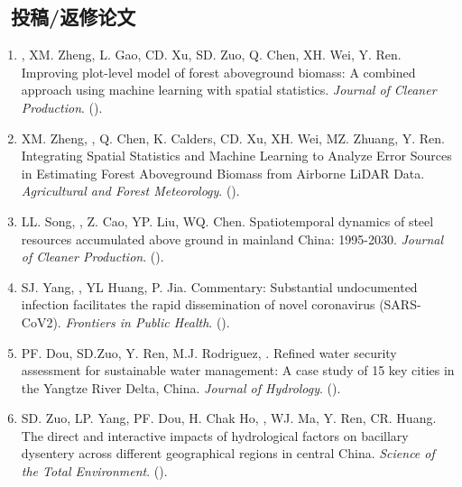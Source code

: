 \subsection*{\texorpdfstring{\faBook\ 投稿/返修论文}{投稿/返修论文}}
\begin{enumerate}
\item
    \Shaoqing\CF, XM. Zheng, L. Gao, CD. Xu, SD. Zuo, Q. Chen, XH. Wei, Y. Ren.
    Improving plot-level model of forest aboveground biomass: A combined approach using machine learning with spatial statistics.
    \textit{Journal of Cleaner Production}. 
    (\Review).
\item
    XM. Zheng, \Shaoqing, Q. Chen, K. Calders, CD. Xu, XH. Wei, MZ. Zhuang, Y. Ren.
    Integrating Spatial Statistics and Machine Learning to Analyze Error Sources in Estimating Forest Aboveground Biomass from Airborne LiDAR Data.
    \textit{Agricultural and Forest Meteorology}. 
    (\Revision).
\item
    LL. Song, \Shaoqing, Z. Cao, YP. Liu, WQ. Chen.
    Spatiotemporal dynamics of steel resources accumulated above ground in mainland China: 1995-2030.
    \textit{Journal of Cleaner Production}. 
    (\Review).
\item
    SJ. Yang, \Shaoqing, YL Huang, P. Jia.
    Commentary: Substantial undocumented infection facilitates the rapid dissemination of novel coronavirus (SARS-CoV2).
    \textit{Frontiers in Public Health}. 
    (\Review).
\item
    PF. Dou, SD.Zuo, Y. Ren, M.J. Rodriguez, \Shaoqing.
    Refined water security assessment for sustainable water management: A case study of 15 key cities in the Yangtze River Delta, China.
    \textit{Journal of Hydrology}.
    (\Revision).
\item
    SD. Zuo, LP. Yang, PF. Dou, H. Chak Ho, \Shaoqing, WJ. Ma, Y. Ren, CR. Huang.
    The direct and interactive impacts of hydrological factors on bacillary dysentery across different geographical regions in central China.
    \textit{Science of the Total Environment}.
    (\Review).
\end{enumerate}